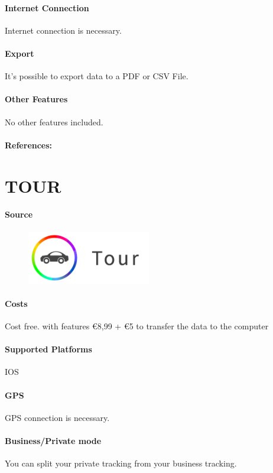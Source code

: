 \paragraph{Internet Connection} Internet connection is necessary.
\paragraph{Export} It’s possible to export data to a PDF or CSV File.
\paragraph{Other Features} No other features included.
\paragraph{References:} \cite{Fahrtenbuch_von_Stefan_Meyer}
\newpage

\section{TOUR}
\paragraph{Source} 
\begin{figure}
  \begin{center}
    \includegraphics[width=0.48\textwidth]{bilder/tour}
  \end{center}
\end{figure}
\paragraph{Costs} Cost free. with features \euro 8,99 + \euro 5 to transfer the data to the computer
\paragraph{Supported Platforms} IOS
\paragraph{GPS} GPS connection is necessary.
\paragraph{Business/Private mode} You can split your private tracking from your business tracking.
